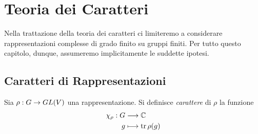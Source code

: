\chapter{Teoria dei Caratteri}
Nella trattazione della teoria dei caratteri ci limiteremo a considerare rappresentazioni complesse di grado finito su gruppi finiti. Per tutto questo capitolo, dunque, assumeremo implicitamente le suddette ipotesi.

\section{Caratteri di Rappresentazioni}

\begin{definition}
Sia $\rho:G\to GL(V)$ una rappresentazione. Si definisce \emph{carattere} di $\rho$ la funzione
\begin{align*}
\chi_\rho:G&\longrightarrow\mathbb{C}\\
g&\longmapsto\operatorname{tr}\rho(g)
\end{align*}
\end{definition}

